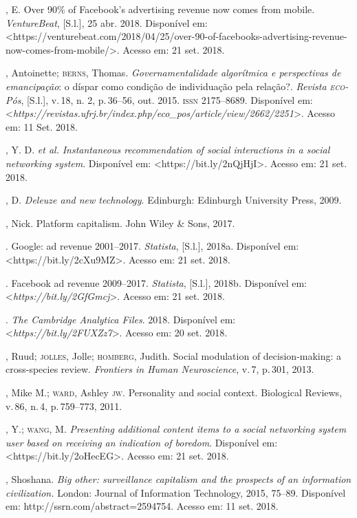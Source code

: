 \begin{bibliohedra}
, E. Over 90\% of Facebook's advertising revenue now comes
from mobile. \emph{VentureBeat}, {[}S.l.{]}, 25 abr. 2018. Disponível
em:
\textless{}https://venturebeat.com/2018/04/25/over-90-of-facebooks-advertising-revenue-now-comes-from-mobile/\textgreater{}.
Acesso em: 21 set. 2018.

, Antoinette; \textsc{berns}, Thomas. \emph{Governamentalidade
algorítmica e perspectivas de emancipação}: o díspar como condição de
individuação pela relação?. \emph{Revista \textsc{eco}-Pós}, {[}S.l.{]}, v.\,18,
n. 2, p.\,36--56, out. 2015. \textsc{issn} 2175--8689. Disponível em:
\textless{}\emph{https://revistas.ufrj.br/index.php/eco\_pos/article/view/2662/2251}\textgreater{}.
Acesso em: 11 Set. 2018.

, Y. D. \emph{et al.} \emph{Instantaneous recommendation of
social interactions in a social networking system}. Disponível em:
\textless{}https://bit.ly/2nQjHjI\textgreater{}.
Acesso em: 21 set. 2018.

, D. \emph{Deleuze and new technology}. Edinburgh: Edinburgh
University Press, 2009.

, Nick. Platform capitalism. John Wiley \& Sons, 2017.

. Google: ad revenue 2001--2017. \emph{Statista}, {[}S.l.{]},
2018a. Disponível em: \textless{}https://bit.ly/2cXu9MZ\textgreater{}.
Acesso em: 21 set. 2018.

\titidem. Facebook ad revenue 2009--2017. \emph{Statista},
{[}S.l.{]}, 2018b. Disponível em:
\textless{}\emph{https://bit.ly/2GfGmcj}\textgreater{}.
Acesso em: 21 set. 2018.

. \emph{The Cambridge Analytica Files}. 2018. Disponível
em: \textless{}\emph{https://bit.ly/2FUXZz7}\textgreater{}. Acesso em: 20 set. 2018.

, Ruud; \textsc{jolles}, Jolle; \textsc{homberg}, Judith. Social modulation of
decision-making: a cross-species review. \emph{Frontiers in Human
Neuroscience}, v.\,7, p.\,301, 2013.

, Mike M.; \textsc{ward}, Ashley \textsc{jw}. Personality and social context.
Biological Reviews, v.\,86, n.\,4, p.\,759--773, 2011.

, Y.; \textsc{wang}, M. \emph{Presenting additional content items to a social
networking system user based on receiving an indication of boredom}.
Disponível em:
\textless{}https://bit.ly/2oHecEG\textgreater{}.
Acesso em: 21 set. 2018.

, Shoshana. \emph{Big other: surveillance capitalism and the
prospects of an information civilization.} London: Journal of
Information Technology, 2015, 75--89. Disponível em:
http://ssrn.com/abstract=2594754. Acesso em: 11 set. 2018.
\end{bibliohedra}


